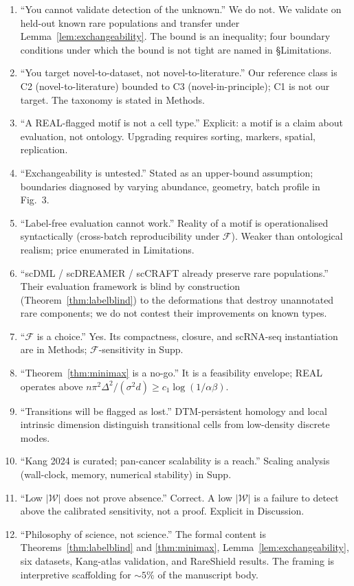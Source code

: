 \begin{enumerate}[label=\textbf{O\arabic*},leftmargin=*]
  \item ``You cannot validate detection of the unknown.'' We do not. We validate on held-out known rare populations and transfer under Lemma~\ref{lem:exchangeability}. The bound is an inequality; four boundary conditions under which the bound is not tight are named in §Limitations.
  \item ``You target novel-to-dataset, not novel-to-literature.'' Our reference class is C2 (novel-to-literature) bounded to C3 (novel-in-principle); C1 is not our target. The taxonomy is stated in Methods.
  \item ``A REAL-flagged motif is not a cell type.'' Explicit: a motif is a claim about evaluation, not ontology. Upgrading requires sorting, markers, spatial, replication.
  \item ``Exchangeability is untested.'' Stated as an upper-bound assumption; boundaries diagnosed by varying abundance, geometry, batch profile in Fig.~3.
  \item ``Label-free evaluation cannot work.'' Reality of a motif is operationalised syntactically (cross-batch reproducibility under $\mathcal{F}$). Weaker than ontological realism; price enumerated in Limitations.
  \item ``scDML / scDREAMER / scCRAFT already preserve rare populations.'' Their evaluation framework is blind by construction (Theorem~\ref{thm:labelblind}) to the deformations that destroy unannotated rare components; we do not contest their improvements on known types.
  \item ``$\mathcal{F}$ is a choice.'' Yes. Its compactness, closure, and scRNA-seq instantiation are in Methods; $\mathcal{F}$-sensitivity in Supp.
  \item ``Theorem~\ref{thm:minimax} is a no-go.'' It is a feasibility envelope; REAL operates above $n\pi^2\Delta^2/(\sigma^2 d) \geq c_1 \log(1/\alpha\beta)$.
  \item ``Transitions will be flagged as lost.'' DTM-persistent homology and local intrinsic dimension distinguish transitional cells from low-density discrete modes.
  \item ``Kang 2024 is curated; pan-cancer scalability is a reach.'' Scaling analysis (wall-clock, memory, numerical stability) in Supp.
  \item ``Low $|\mathcal{W}|$ does not prove absence.'' Correct. A low $|\mathcal{W}|$ is a failure to detect above the calibrated sensitivity, not a proof. Explicit in Discussion.
  \item ``Philosophy of science, not science.'' The formal content is Theorems~\ref{thm:labelblind} and \ref{thm:minimax}, Lemma~\ref{lem:exchangeability}, six datasets, Kang-atlas validation, and RareShield results. The framing is interpretive scaffolding for $\sim 5\%$ of the manuscript body.
\end{enumerate}

